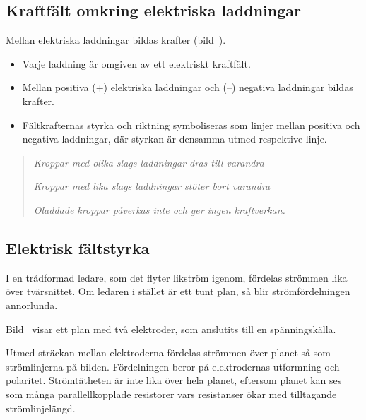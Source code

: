 \newpage
{}

\subsection{Kraftfält omkring elektriska laddningar}


\noindent
Mellan elektriska laddningar bildas krafter (bild~).

\begin{itemize}
  \item Varje laddning är omgiven av ett elektriskt kraftfält.
  \item Mellan positiva (+) elektriska laddningar och (--) negativa laddningar
  bildas krafter.
  \item Fältkrafternas styrka och riktning symboliseras som linjer mellan
  positiva och negativa laddningar, där styrkan är densamma utmed respektive
  linje.
\end{itemize}


\begin{quote}
\emph{Kroppar med olika slags laddningar dras till varandra}

\emph{Kroppar med lika slags laddningar stöter bort varandra}

\emph{Oladdade kroppar påverkas inte och ger ingen kraftverkan.}
\end{quote}

\subsection{Elektrisk fältstyrka}
\label{elektrisk_fälststyrka}


I en trådformad ledare, som det flyter likström igenom, fördelas strömmen lika
över tvärsnittet.
Om ledaren i stället är ett tunt plan, så blir strömfördelningen annorlunda.

Bild~ visar ett plan med två elektroder, som anslutits
till en spänningskälla.

Utmed sträckan mellan elektroderna fördelas strömmen över planet så som
strömlinjerna på bilden.
Fördelningen beror på elektrodernas utformning och polaritet.
Strömtätheten är inte lika över hela planet, eftersom planet kan ses som många
parallellkopplade resistorer vars resistanser ökar med tilltagande
strömlinjelängd.


